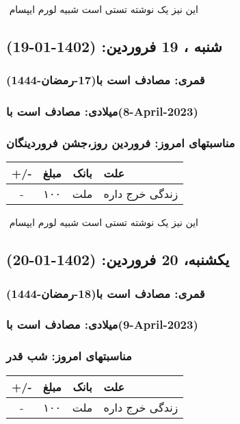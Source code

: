 \documentclass{article}
\newcommand{\rnote}[1]{\marginpar{\textcolor{color}{\StrSubstitute{\##1}{ }{\_}}}}
\newcommand{\myRow}[4]{
    #1 & #2 & #3 & #4 \\ \hline
}
\begin{document}
‌
\rnote{تست}
این نیز یک نوشته تستی است شبیه لورم ایپسام




\newpage
{}
\textcolor{color}{
\section{ شنبه ، 19 فروردین: (1402-01-19) }
\subsubsection*{قمری: مصادف است با(17-رمضان-1444)} 
\subsubsection*{میلادی: مصادف است با(8-April-2023)}
\subsubsection*{مناسبتهای امروز: فروردین روز،جشن فروردینگان}
}


\begin{tabular}{ | c | c | c | p{5cm} |}
    \hline
    \myRow{ +/- }{مبلغ}{بانک}{علت}
    \myRow{-}{۱۰۰}{ملت}{زندگی خرج داره}
\end{tabular}
\newline
\newline

‌
\rnote{تست}
این نیز یک نوشته تستی است شبیه لورم ایپسام




\newpage
{}
\textcolor{color}{
\section{ یکشنبه، 20 فروردین: (1402-01-20) }
\subsubsection*{قمری: مصادف است با(18-رمضان-1444)} 
\subsubsection*{میلادی: مصادف است با(9-April-2023)}
\subsubsection*{مناسبتهای امروز: شب قدر}
}


\begin{tabular}{ | c | c | c | p{5cm} |}
    \hline
    \myRow{ +/- }{مبلغ}{بانک}{علت}
    \myRow{-}{۱۰۰}{ملت}{زندگی خرج داره}
\end{tabular}
\newline
\newline
\end{document}
